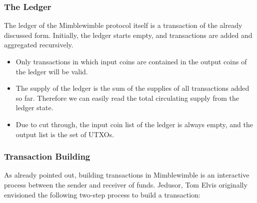 \subsubsection{The Ledger}
The ledger of the Mimblewimble protocol itself is a transaction of the already discussed form. Initially, the ledger starts empty, and transactions are added and aggregated recursively.
\begin{itemize}
    \item Only transactions in which input coins are contained in the output coins of the ledger will be valid.
    \item The supply of the ledger is the sum of the supplies of all transactions added so far. Therefore we can easily read the total circulating supply from the ledger state.
    \item Due to cut through, the input coin list of the ledger is always empty, and the output list is the set of UTXOs.
\end{itemize}

\subsubsection{Transaction Building}
As already pointed out, building transactions in Mimblewimble is an interactive process between the sender and receiver of funds. Jedusor, Tom Elvis originally envisioned the following two-step process
to build a transaction:~\cite{jedusor2016mimblewimble}

